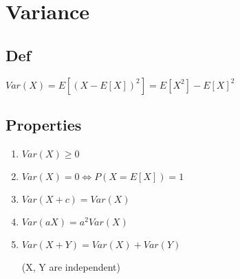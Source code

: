 \section{Variance}
    \subsection*{Def}
        $Var(X)=E[(X-E[X])^2]=E[X^2]-E[X]^2$

    \subsection*{Properties}
        \begin{enumerate}
            \item $Var(X) \geq 0$
            \item $Var(X) = 0 \iff P(X=E[X]) = 1$
            \item $Var(X+c) = Var(X)$
            \item $Var(aX)=a^2Var(X)$
            \item $Var(X+Y) = Var(X) + Var(Y)$
            
            (X, Y are independent)
        \end{enumerate}


